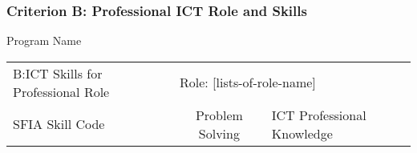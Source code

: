 \documentclass{article}%
\begin{document}
%
\subsubsection{Criterion B: Professional ICT Role and Skills}%
\label{ssubsec:CriterionBProfessionalICTRoleandSkills}%
Program Name\newline%
%
\begin{adjustbox}{max width=\textwidth}%
\begin{tabular}{|c|c|c|c|c|c|c|c|c|c|c|c|c|c|c|c|c|c|c|c|}%
\hline%
\multicolumn{9}{|l|}{\multirow{2}{*}{B:ICT Skills for Professional Role}}&\multicolumn{11}{|l|}{\multirow{2}{*}{Role: {[}lists{-}of{-}role{-}name{]}}}\\%
\multicolumn{9}{|l|}{}&\multicolumn{11}{|l|}{}\\%
\hline%
\multicolumn{9}{|l|}{SFIA Skill Code}&\multicolumn{3}{|c|}{Problem Solving}&\multicolumn{8}{|l|}{ICT Professional Knowledge}\\%
\hline%
\end{tabular}%
\end{adjustbox}

%
\end{document}
